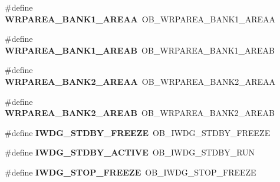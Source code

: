 \begin{DoxyCompactItemize}
\item 
\#define {\bfseries W\+R\+P\+A\+R\+E\+A\+\_\+\+B\+A\+N\+K1\+\_\+\+A\+R\+E\+AA}~O\+B\+\_\+\+W\+R\+P\+A\+R\+E\+A\+\_\+\+B\+A\+N\+K1\+\_\+\+A\+R\+E\+AA\hypertarget{group___h_a_l___f_l_a_s_h___aliased___defines_ga4d57e7a32711f223077cc45a55b4d333}{}\label{group___h_a_l___f_l_a_s_h___aliased___defines_ga4d57e7a32711f223077cc45a55b4d333}

\item 
\#define {\bfseries W\+R\+P\+A\+R\+E\+A\+\_\+\+B\+A\+N\+K1\+\_\+\+A\+R\+E\+AB}~O\+B\+\_\+\+W\+R\+P\+A\+R\+E\+A\+\_\+\+B\+A\+N\+K1\+\_\+\+A\+R\+E\+AB\hypertarget{group___h_a_l___f_l_a_s_h___aliased___defines_ga073be154a6602831a813316fa4fb17ca}{}\label{group___h_a_l___f_l_a_s_h___aliased___defines_ga073be154a6602831a813316fa4fb17ca}

\item 
\#define {\bfseries W\+R\+P\+A\+R\+E\+A\+\_\+\+B\+A\+N\+K2\+\_\+\+A\+R\+E\+AA}~O\+B\+\_\+\+W\+R\+P\+A\+R\+E\+A\+\_\+\+B\+A\+N\+K2\+\_\+\+A\+R\+E\+AA\hypertarget{group___h_a_l___f_l_a_s_h___aliased___defines_ga385f3bbec731cc31de0a8f83943f678c}{}\label{group___h_a_l___f_l_a_s_h___aliased___defines_ga385f3bbec731cc31de0a8f83943f678c}

\item 
\#define {\bfseries W\+R\+P\+A\+R\+E\+A\+\_\+\+B\+A\+N\+K2\+\_\+\+A\+R\+E\+AB}~O\+B\+\_\+\+W\+R\+P\+A\+R\+E\+A\+\_\+\+B\+A\+N\+K2\+\_\+\+A\+R\+E\+AB\hypertarget{group___h_a_l___f_l_a_s_h___aliased___defines_gad9e82d85eb324cdc5d4c5071a5b41dc6}{}\label{group___h_a_l___f_l_a_s_h___aliased___defines_gad9e82d85eb324cdc5d4c5071a5b41dc6}

\item 
\#define {\bfseries I\+W\+D\+G\+\_\+\+S\+T\+D\+B\+Y\+\_\+\+F\+R\+E\+E\+ZE}~O\+B\+\_\+\+I\+W\+D\+G\+\_\+\+S\+T\+D\+B\+Y\+\_\+\+F\+R\+E\+E\+ZE\hypertarget{group___h_a_l___f_l_a_s_h___aliased___defines_ga29ecb28c7e5de9b73778a4de74cdba4e}{}\label{group___h_a_l___f_l_a_s_h___aliased___defines_ga29ecb28c7e5de9b73778a4de74cdba4e}

\item 
\#define {\bfseries I\+W\+D\+G\+\_\+\+S\+T\+D\+B\+Y\+\_\+\+A\+C\+T\+I\+VE}~O\+B\+\_\+\+I\+W\+D\+G\+\_\+\+S\+T\+D\+B\+Y\+\_\+\+R\+UN\hypertarget{group___h_a_l___f_l_a_s_h___aliased___defines_ga24bb71bfed2d31ab1c89e2c14617a738}{}\label{group___h_a_l___f_l_a_s_h___aliased___defines_ga24bb71bfed2d31ab1c89e2c14617a738}

\item 
\#define {\bfseries I\+W\+D\+G\+\_\+\+S\+T\+O\+P\+\_\+\+F\+R\+E\+E\+ZE}~O\+B\+\_\+\+I\+W\+D\+G\+\_\+\+S\+T\+O\+P\+\_\+\+F\+R\+E\+E\+ZE\hypertarget{group___h_a_l___f_l_a_s_h___aliased___defines_gafa9a4aaff8763eed2aaeae674dffd159}{}\label{group___h_a_l___f_l_a_s_h___aliased___defines_gafa9a4aaff8763eed2aaeae674dffd159}


\end{DoxyCompactItemize}
